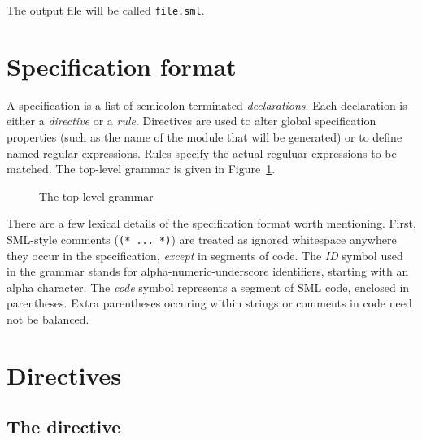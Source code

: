 \vskip 10pt \noindent
The output file will be called {\tt file.sml}.

\section{Specification format}

A \ulex{} specification is a list of semicolon-terminated \emph{declarations}.  Each declaration is either a \emph{directive} or a \emph{rule}.  Directives are used to alter global specification properties (such as the name of the module that will be generated) or to define named regular expressions.  Rules specify the actual reguluar expressions to be matched.  The top-level grammar is given in Figure~\ref{fig:ulex-syntax}.

\begin{figure}
\caption{The top-level \ulex{} grammar}\label{fig:ulex-syntax}
\end{figure}

There are a few lexical details of the specification format worth mentioning.  First, SML-style comments (\texttt{(* ... *)}) are treated as ignored whitespace anywhere they occur in the specification, \emph{except} in segments of code.  The \textit{ID} symbol used in the grammar stands for alpha-numeric-underscore identifiers, starting with an alpha character.  The \textit{code} symbol represents a segment of SML code, enclosed in parentheses.  Extra parentheses occuring within strings or comments in code need not be balanced.

\section{Directives}

\subsection{The  directive}

